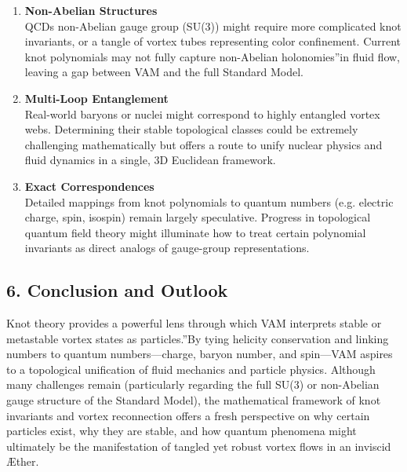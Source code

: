 \begin{enumerate}
    \item \textbf{Non-Abelian Structures} \\
    QCD\rqs s non-Abelian gauge group (SU(3)) might require more complicated knot invariants, or a tangle of vortex tubes representing color confinement. Current knot polynomials may not fully capture non-Abelian \grqq holonomies\textquotedblright in fluid flow, leaving a gap between VAM and the full Standard Model.
    \item \textbf{Multi-Loop Entanglement} \\
    Real-world baryons or nuclei might correspond to highly entangled vortex webs. Determining their stable topological classes could be extremely challenging mathematically but offers a route to unify nuclear physics and fluid dynamics in a single, 3D Euclidean framework.
    \item \textbf{Exact Correspondences} \\
    Detailed mappings from knot polynomials to quantum numbers (e.g. electric charge, spin, isospin) remain largely speculative. Progress in topological quantum field theory might illuminate how to treat certain polynomial invariants as direct analogs of gauge-group representations.
\end{enumerate}

\subsection*{6. Conclusion and Outlook}

Knot theory provides a powerful lens through which VAM interprets stable or metastable vortex states as \grqq particles.\textquotedblright By tying helicity conservation and linking numbers to quantum numbers—charge, baryon number, and spin—VAM aspires to a topological unification of fluid mechanics and particle physics. Although many challenges remain (particularly regarding the full SU(3) or non-Abelian gauge structure of the Standard Model), the mathematical framework of knot invariants and vortex reconnection offers a fresh perspective on why certain particles exist, why they are stable, and how quantum phenomena might ultimately be the manifestation of tangled yet robust vortex flows in an inviscid Æther.